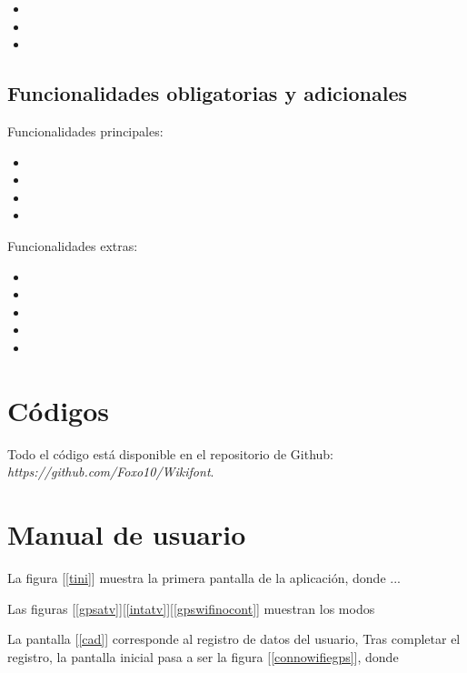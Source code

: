 \documentclass[11pt,a4paper]{article}
\begin{document}
\begin{itemize}
    \item 
    \item 
    \item 
\end{itemize}

\subsection{Funcionalidades obligatorias y adicionales}

Funcionalidades principales:
\begin{itemize}
  \item  
  \item 
  \item 
  \item 
    
\end{itemize}

	
    Funcionalidades extras:\\
    
\begin{itemize}
  \item 
  \item 
  \item 
  \item 
  \item 
\end{itemize}


\section{Códigos}

Todo el código está disponible en el repositorio de Github: \\ \textit{https://github.com/Foxo10/Wikifont}.



\section{Manual de usuario}

	La figura [\ref{tini}] muestra la primera pantalla de la aplicación, donde ... 
    
    Las figuras [\ref{gpsatv}][\ref{intatv}][\ref{gpswifinocont}] muestran los modos 
    
    La pantalla [\ref{cad}] corresponde al registro de datos del usuario, 
    Tras completar el registro, la pantalla inicial pasa a ser la figura [\ref{connowifiegps}], donde
    
\end{document}
